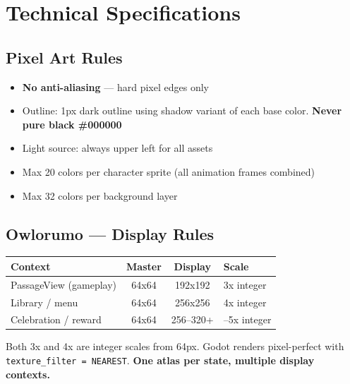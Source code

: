 \documentclass[11pt, a4paper]{article}
\begin{document}
\section{Technical Specifications}

\subsection{Pixel Art Rules}
\begin{itemize}[leftmargin=1.5em, itemsep=2pt]
  \item \textbf{No anti-aliasing} --- hard pixel edges only
  \item Outline: 1px dark outline using shadow variant of each base color.
        \textbf{Never pure black \#000000}
  \item Light source: always upper left for all assets
  \item Max 20 colors per character sprite (all animation frames combined)
  \item Max 32 colors per background layer
\end{itemize}

\subsection{Owlorumo --- Display Rules}

\begin{tabularx}{\textwidth}{@{}l c c >{\raggedright\arraybackslash}X@{}}
  \toprule
  \rowcolor{tabhead}
  \color{white}\sffamily\bfseries Context &
  \color{white}\sffamily\bfseries Master &
  \color{white}\sffamily\bfseries Display &
  \color{white}\sffamily\bfseries Scale \\
  \midrule
  \rowcolor{tabrow}PassageView (gameplay) & 64x64 & 192x192 & 3x integer \\
  Library / menu & 64x64 & 256x256 & 4x integer \\
  \rowcolor{tabrow}Celebration / reward & 64x64 & 256--320+ & 4--5x integer \\
  \bottomrule
\end{tabularx}

\begin{notebox}
  Both 3x and 4x are integer scales from 64px. Godot renders pixel-perfect with
  \texttt{texture\_filter = NEAREST}. \textbf{One atlas per state, multiple display contexts.}
\end{notebox}
\end{document}
